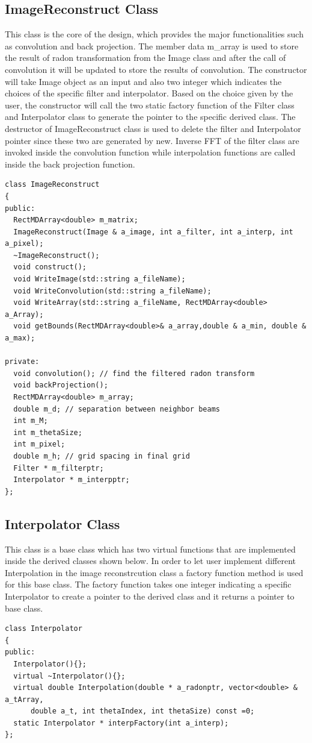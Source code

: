 \subsection{ImageReconstruct Class}
This class is the core of the design, which provides the major functionalities such as convolution and back projection. The member data m\_array is used to store the result of radon transformation from the Image class and after the call of convolution it will be updated to store the results of convolution. The constructor will take Image object as an input and also two integer which indicates the choices of the specific filter and interpolator. Based on the choice given by the user, the constructor will call the two static factory function of the Filter class and Interpolator class to generate the pointer to the specific derived class. The destructor of ImageReconstruct class is used to delete the filter and Interpolator pointer since these two are generated by new. Inverse FFT of the filter class are invoked inside the convolution function while interpolation functions are called inside the back projection function.   
\begin{verbatim}
class ImageReconstruct
{
public:
  RectMDArray<double> m_matrix;
  ImageReconstruct(Image & a_image, int a_filter, int a_interp, int a_pixel);
  ~ImageReconstruct();
  void construct();
  void WriteImage(std::string a_fileName);
  void WriteConvolution(std::string a_fileName);
  void WriteArray(std::string a_fileName, RectMDArray<double> a_Array);
  void getBounds(RectMDArray<double>& a_array,double & a_min, double & a_max);
 
private:
  void convolution(); // find the filtered radon transform
  void backProjection(); 
  RectMDArray<double> m_array;
  double m_d; // separation between neighbor beams
  int m_M;
  int m_thetaSize;
  int m_pixel;
  double m_h; // grid spacing in final grid
  Filter * m_filterptr;
  Interpolator * m_interpptr;
};
\end{verbatim}

\subsection{Interpolator Class}
This class is a base class which has two virtual functions that are implemented inside the derived classes shown below. In order to let user implement different Interpolation in the image reconstrcution class a factory function method is used for this base class. The factory function takes one integer indicating a specific Interpolator to create a pointer to the derived class and it returns a pointer to base class.
\begin{verbatim}
class Interpolator
{
public:
  Interpolator(){};
  virtual ~Interpolator(){};
  virtual double Interpolation(double * a_radonptr, vector<double> & a_tArray, 
      double a_t, int thetaIndex, int thetaSize) const =0;
  static Interpolator * interpFactory(int a_interp);
};  
\end{verbatim}


